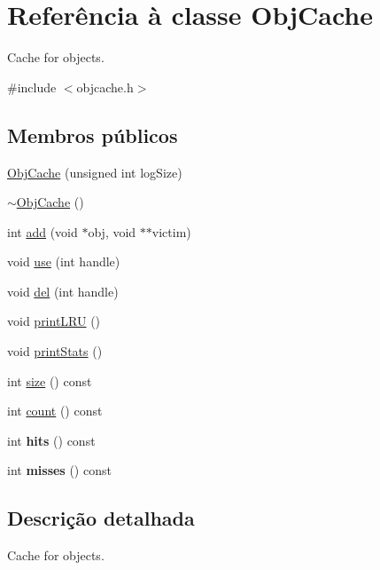 \hypertarget{class_obj_cache}{\section{Referência à classe Obj\-Cache}
\label{class_obj_cache}
}


Cache for objects.  




{\ttfamily \#include $<$objcache.\-h$>$}

\subsection*{Membros públicos}
\begin{DoxyCompactItemize}
\item 
\hyperlink{class_obj_cache_a351d5e64b9ea1f2e5d08bafc14bd1092}{Obj\-Cache} (unsigned int log\-Size)
\item 
\hyperlink{class_obj_cache_ace7a3c9ec0ffcb449cbd3b80e00f326d}{$\sim$\-Obj\-Cache} ()
\item 
int \hyperlink{class_obj_cache_ae872802a47cdedc65dde17904896d21e}{add} (void $\ast$obj, void $\ast$$\ast$victim)
\item 
void \hyperlink{class_obj_cache_a802ab97442f11fa78e2736893a8c9811}{use} (int handle)
\item 
void \hyperlink{class_obj_cache_a12b865801b36fe33b5543d4388c4f2a0}{del} (int handle)
\item 
void \hyperlink{class_obj_cache_a810b39ea58bf7c15b2734f509b32c72b}{print\-L\-R\-U} ()
\item 
void \hyperlink{class_obj_cache_a0beecd7e864561c9474bc80e993556bf}{print\-Stats} ()
\item 
int \hyperlink{class_obj_cache_ab8e4e3e2a7bf18888b71bdf9dda0770b}{size} () const 
\item 
int \hyperlink{class_obj_cache_a0745638c9967e2ed90bc96c012288c55}{count} () const 
\item 
\hypertarget{class_obj_cache_ab5211b6adcb89c296fcc3b6f60b8b6c7}{int {\bfseries hits} () const }\label{class_obj_cache_ab5211b6adcb89c296fcc3b6f60b8b6c7}

\item 
\hypertarget{class_obj_cache_ad9a016e5d65ed3c1d57ade79ac7d4e35}{int {\bfseries misses} () const }\label{class_obj_cache_ad9a016e5d65ed3c1d57ade79ac7d4e35}

\end{DoxyCompactItemize}


\subsection{Descrição detalhada}
Cache for objects. 

